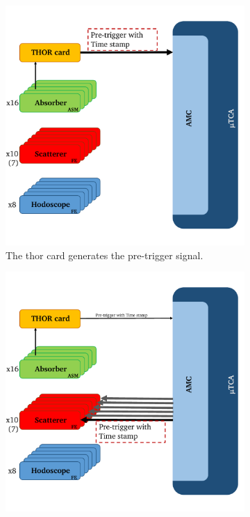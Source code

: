 \begin{figure}
\begin{subfigure}[b]{0.5\textwidth}
 \centering
\includegraphics[width=0.9\linewidth]{03_GraphicFiles/appendixA_dataFormat/triggerLogic_2.pdf}
\caption[Pre-trigger generation in the \gls{thor} card.]{The \gls{thor} card generates the pre-trigger signal.}
\label{chapappA::subfig::triggerLogic_2}
\end{subfigure}%
\newline
\begin{subfigure}[b]{0.5\textwidth}
 \centering
\includegraphics[width=0.9\linewidth]{03_GraphicFiles/appendixA_dataFormat/triggerLogic_3.pdf}

\end{subfigure}
\end{figure}
